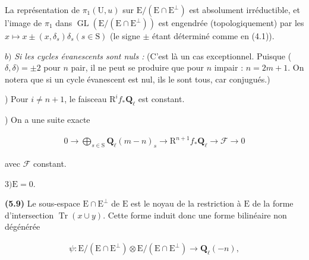 \documentclass[10pt,leqno]{article}
\begin{document}
\noindent La représentation de \(\pi _{1}(\mathrm{U},u)\) sur \(\mathrm{E}/(\mathrm{E}\cap \mathrm{E}^{\perp })\) est absolument irréductible, et l’image de \(\pi _{1}\) dans \(\operatorname{GL}(\mathrm{E}/(\mathrm{E}\cap \mathrm{E}^{\perp }))\) est engendrée (topologiquement) par les \(x\longmapsto x\pm (x,\delta _{s})\delta _{s} (s\in \mathrm{S})\) (le signe \(\pm \) étant déterminé comme en (4.1)).\par

\clearpage

\label{physical-22}\par\smallskip

\noindent \(b)\) \emph{Si les cycles évanescents sont nuls :} (C’est là un cas exceptionnel. Puisque (\(\delta ,\delta )=\pm 2\) pour \(n\) pair, il ne peut se produire que pour \(n\) impair : \(n=2m+1\). On notera que si un cycle évanescent est nul, ils le sont tous, car conjugués.)\par

) Pour \(i\ne n+1\), le faisceau \(\mathrm{R}^{i} f_{*}\mathbf{Q}_{\ell }\) est constant.\par

) On a une suite exacte\par

\begin{equation*}\begin{gathered}0 \longrightarrow  \bigoplus\limits_{s\in \mathrm{S}} \mathbf{Q}_{\ell }(m- n)_{s} \longrightarrow  \mathrm{R}^{n+1}f_{*}\mathbf{Q}_{\ell } \longrightarrow  \mathcal{F}  \longrightarrow  0\end{gathered}\end{equation*}

\noindent avec \(\mathcal{F} \) constant.\par

\noindent \(3) \mathrm{E}=0\).\par

\noindent \textbf{(5.9)} Le sous-espace \(\mathrm{E}\cap \mathrm{E}^{\perp }\) de \(\mathrm{E}\) est le noyau de la restriction à \(\mathrm{E}\) de la forme d’intersection \(\operatorname{Tr}(x\cup y)\). Cette forme induit donc une forme bilinéaire non dégénérée\par

\begin{equation*}\begin{gathered}\psi  : \mathrm{E}/(\mathrm{E}\cap \mathrm{E}^{\perp })\otimes \mathrm{E}/(\mathrm{E}\cap \mathrm{E}^{\perp }) \longrightarrow  \mathbf{Q}_{\ell }(- n),\end{gathered}\end{equation*}
\end{document}
